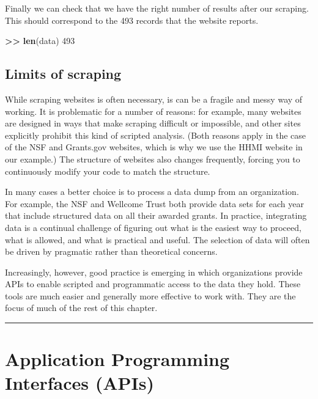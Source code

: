 \documentclass[]{krantz}
\newenvironment{Shaded}{\begin{snugshade}}{\end{snugshade}}
\newcommand{\KeywordTok}[1]{\textcolor[rgb]{0.13,0.29,0.53}{\textbf{#1}}}
\newcommand{\DecValTok}[1]{\textcolor[rgb]{0.00,0.00,0.81}{#1}}
\newcommand{\StringTok}[1]{\textcolor[rgb]{0.31,0.60,0.02}{#1}}
\newcommand{\OperatorTok}[1]{\textcolor[rgb]{0.81,0.36,0.00}{\textbf{#1}}}
\newcommand{\ErrorTok}[1]{\textcolor[rgb]{0.64,0.00,0.00}{\textbf{#1}}}
\newcommand{\NormalTok}[1]{#1}
\begin{document}
Finally we can check that we have the right number of results after our
scraping. This should correspond to the 493 records that the website
reports.

\begin{Shaded}
\begin{Highlighting}[]
\OperatorTok{>}\ErrorTok{>}\StringTok{ }\KeywordTok{len}\NormalTok{(data)}
\DecValTok{493}
\end{Highlighting}
\end{Shaded}

\subsection{Limits of scraping}\label{sec:4-1.2}

While scraping websites is often necessary, is can be a fragile and
messy way of working. It is problematic for a number of reasons: for
example, many websites are designed in ways that make scraping difficult
or impossible, and other sites explicitly prohibit this kind of scripted
analysis. (Both reasons apply in the case of the NSF and Grants.gov
websites, which is why we use the HHMI website in our example.) The
structure of websites also changes frequently, forcing you to
continuously modify your code to match the structure.

In many cases a better choice is to process a data dump from an
organization. For example, the NSF and Wellcome Trust both provide data
sets for each year that include structured data on all their awarded
grants. In practice, integrating data is a continual challenge of
figuring out what is the easiest way to proceed, what is allowed, and
what is practical and useful. The selection of data will often be driven
by pragmatic rather than theoretical concerns.

Increasingly, however, good practice is emerging in which organizations
provide APIs to enable scripted and programmatic access to the data they
hold. These tools are much easier and generally more effective to work
with. They are the focus of much of the rest of this chapter.

\begin{center}\rule{0.5\linewidth}{\linethickness}\end{center}

\section{Application Programming Interfaces (APIs)}\label{sec:4-3}
\end{document}
